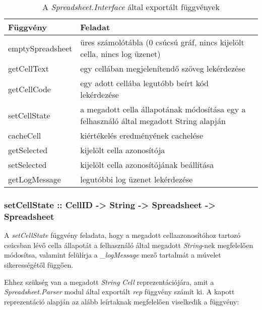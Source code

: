 \begin{table}
	\centering
	\begin{tabularx}{\textwidth}{ |l|X|X|}
		\hline
		Függvény  & Feladat \\
		\hline\hline
		emptySpreadsheet &  üres számolótábla (0 csúcsú gráf, nincs kijelölt cella, nincs log üzenet) \\
		\hline
		getCellText & egy cellában megjelenítendő szöveg lekérdezése \\
		\hline
		getCellCode & egy adott cellába legutóbb beírt kód lekérdezése \\
		\hline
		setCellState & a megadott cella állapotának módosítása egy a felhasználó által megadott String alapján \\
		\hline
		cacheCell & kiértékelés eredményének cachelése \\
		\hline
		getSelected & kijelölt cella azonosítója \\
		\hline
		setSelected & kijelölt cella azonosítójának beállítása \\
		\hline 
		getLogMessage & legutóbbi log üzenet lekérdezése \\
		\hline
	\end{tabularx}
	\caption[A \textit{Spreadsheet.Interface} által exportált függvények]{A \textit{Spreadsheet.Interface} által exportált függvények}
	\label{tab:interface}
\end{table}

\subsubsection{setCellState :: CellID -> String -> Spreadsheet -> Spreadsheet}

A \textit{setCellState} függvény feladata, hogy a megadott cellaazonosítóhoz tartozó csúcsban lévő cella állapotát a felhasználó által megadott \textit{String}-nek megfelelően módosítsa, valamint felülírja a \textit{\_logMessage} mező tartalmát a múvelet sikerességétől függően.

Ehhez szükség van a megadott \textit{String} \textit{Cell} reprezentációjára, amit a \textit{Spreadsheet.Parser} modul által exportált \textit{rep} függvény számít ki. A kapott reprezentáció alapján az alább leírtaknak megfelelően viselkedik a függvény:

